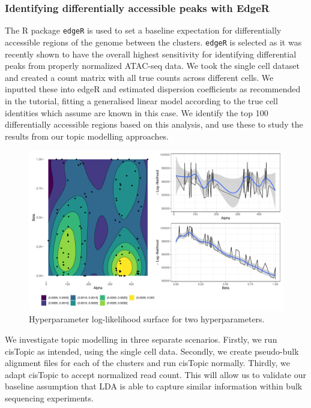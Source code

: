 \subsubsection{Identifying differentially accessible peaks with EdgeR} \label{ch4:edgeR}

The R package {\tt edgeR} is used to set a baseline expectation for differentially accessible regions of the genome between the clusters. {\tt edgeR} is selected as it was recently shown to have the overall highest sensitivity for identifying differential peaks from properly normalized ATAC-seq data. We took the single cell dataset and created a count matrix with all true counts across different cells. We inputted these into edgeR and estimated dispersion coefficients as recommended in the tutorial, fitting a generalised linear model according to the true cell identities which assume are known in this case. We identify the top 100 differentially accessible regions based on this analysis, and use these to study the results from our topic modelling approaches.

\begin{figure}
  \centering
  \includegraphics[width=\textwidth]{plot/ch4/sim_ll_surface.pdf}
  \caption{Hyperparameter log-likelihood surface for two hyperparameters.}
  \label{fig:llhood_surfacea_simulation}
\end{figure}

We investigate topic modelling in three separate scenarios. Firstly, we run cisTopic as intended, using the single cell data. Secondly, we create pseudo-bulk alignment files for each of the clusters and run cisTopic normally. Thirdly, we adapt cisTopic to accept normalized read count. This will allow us to validate our baseline assumption that LDA is able to capture similar information within bulk sequencing experiments.

